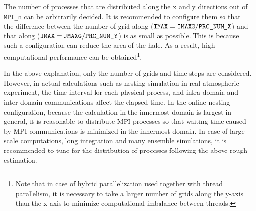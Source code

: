 The number of processes that are distributed along the x and y directions  out of \verb|MPI_n| can be arbitrarily decided.
It is recommended to configure them so that the difference between the number of grid along \XDIR ($\nmitemeq{IMAX}=\nmitemeq{IMAXG}/\nmitemeq{PRC_NUM_X}$) and that along \YDIR ($\nmitemeq{JMAX}=\nmitemeq{JMAXG}/\nmitemeq{PRC_NUM_Y}$) is as small as possible.
This is because such a configuration can reduce the area of the halo.
As a result, high computational performance can be obtained\footnote{Note that in case of hybrid parallelization used together with thread parallelism, it is necessary to take a larger number of grids along the y-axis than the x-axis to minimize computational imbalance between threads.}.


In the above explanation, only the number of grids and time steps are considered. However, in actual calculations such as nesting simulation in real atmospheric experiment, the time interval for each physical process, and intra-domain and inter-domain communications affect the elapsed time. In the online nesting configuration, because the calculation in the innermost domain is largest in general, it is reasonable to distribute MPI processes so that waiting time caused by MPI communications is minimized in the innermost domain.  In case of large-scale computations, long integration and many ensemble simulations, it is recommended to tune for the distribution of processes following the above rough estimation.

